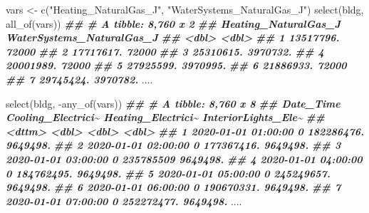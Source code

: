 \documentclass[
]{book}
\newenvironment{Shaded}{\begin{snugshade}}{\end{snugshade}}
\newcommand{\DocumentationTok}[1]{\textcolor[rgb]{0.56,0.35,0.01}{\textbf{\textit{#1}}}}
\newcommand{\FunctionTok}[1]{\textcolor[rgb]{0.00,0.00,0.00}{#1}}
\newcommand{\NormalTok}[1]{#1}
\newcommand{\OtherTok}[1]{\textcolor[rgb]{0.56,0.35,0.01}{#1}}
\newcommand{\SpecialCharTok}[1]{\textcolor[rgb]{0.00,0.00,0.00}{#1}}
\newcommand{\StringTok}[1]{\textcolor[rgb]{0.31,0.60,0.02}{#1}}
\begin{document}
\begin{Shaded}
\begin{Highlighting}[]
\NormalTok{vars }\OtherTok{\textless{}{-}} \FunctionTok{c}\NormalTok{(}\StringTok{"Heating\_NaturalGas\_J"}\NormalTok{, }\StringTok{"WaterSystems\_NaturalGas\_J"}\NormalTok{)}
\FunctionTok{select}\NormalTok{(bldg, }\FunctionTok{all\_of}\NormalTok{(vars))}
\DocumentationTok{\#\# \# A tibble: 8,760 x 2}
\DocumentationTok{\#\#    Heating\_NaturalGas\_J WaterSystems\_NaturalGas\_J}
\DocumentationTok{\#\#                   \textless{}dbl\textgreater{}                     \textless{}dbl\textgreater{}}
\DocumentationTok{\#\#  1            13517796.                    72000 }
\DocumentationTok{\#\#  2            17717617.                    72000 }
\DocumentationTok{\#\#  3            25310615.                  3970732.}
\DocumentationTok{\#\#  4            20001989.                    72000 }
\DocumentationTok{\#\#  5            27925599.                  3970995.}
\DocumentationTok{\#\#  6            21886933.                    72000 }
\DocumentationTok{\#\#  7            29745424.                  3970782.}
\NormalTok{....}

\FunctionTok{select}\NormalTok{(bldg, }\SpecialCharTok{{-}}\FunctionTok{any\_of}\NormalTok{(vars))}
\DocumentationTok{\#\# \# A tibble: 8,760 x 8}
\DocumentationTok{\#\#    Date\_Time           Cooling\_Electrici\textasciitilde{} Heating\_Electrici\textasciitilde{} InteriorLights\_Ele\textasciitilde{}}
\DocumentationTok{\#\#    \textless{}dttm\textgreater{}                           \textless{}dbl\textgreater{}              \textless{}dbl\textgreater{}               \textless{}dbl\textgreater{}}
\DocumentationTok{\#\#  1 2020{-}01{-}01 01:00:00                  0         182286476.            9649498.}
\DocumentationTok{\#\#  2 2020{-}01{-}01 02:00:00                  0         177367416.            9649498.}
\DocumentationTok{\#\#  3 2020{-}01{-}01 03:00:00                  0         235785509             9649498.}
\DocumentationTok{\#\#  4 2020{-}01{-}01 04:00:00                  0         184762495.            9649498.}
\DocumentationTok{\#\#  5 2020{-}01{-}01 05:00:00                  0         245249657.            9649498.}
\DocumentationTok{\#\#  6 2020{-}01{-}01 06:00:00                  0         190670331.            9649498.}
\DocumentationTok{\#\#  7 2020{-}01{-}01 07:00:00                  0         252272477.            9649498.}
\NormalTok{....}
\end{Highlighting}
\end{Shaded}
\end{document}
